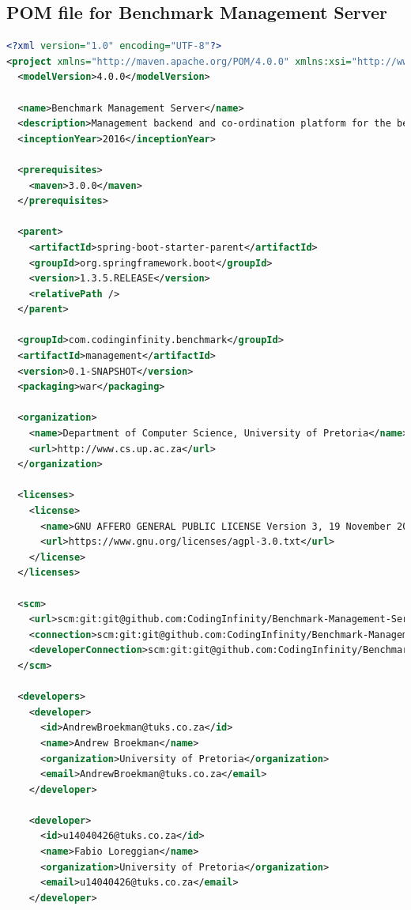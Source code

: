 \documentclass[11pt,a4paper]{article}
\begin{document}
\subsection{POM file for Benchmark Management Server}
\begin{lstlisting}[language=xml]
<?xml version="1.0" encoding="UTF-8"?>
<project xmlns="http://maven.apache.org/POM/4.0.0" xmlns:xsi="http://www.w3.org/2001/XMLSchema-instance" xsi:schemaLocation="http://maven.apache.org/POM/4.0.0 http://maven.apache.org/maven-v4_0_0.xsd">
  <modelVersion>4.0.0</modelVersion>

  <name>Benchmark Management Server</name>
  <description>Management backend and co-ordination platform for the benchmark service platform</description>
  <inceptionYear>2016</inceptionYear>

  <prerequisites>
    <maven>3.0.0</maven>
  </prerequisites>

  <parent>
    <artifactId>spring-boot-starter-parent</artifactId>
    <groupId>org.springframework.boot</groupId>
    <version>1.3.5.RELEASE</version>
    <relativePath />
  </parent>

  <groupId>com.codinginfinity.benchmark</groupId>
  <artifactId>management</artifactId>
  <version>0.1-SNAPSHOT</version>
  <packaging>war</packaging>

  <organization>
    <name>Department of Computer Science, University of Pretoria</name>
    <url>http://www.cs.up.ac.za</url>
  </organization>

  <licenses>
    <license>
      <name>GNU AFFERO GENERAL PUBLIC LICENSE Version 3, 19 November 2007</name>
      <url>https://www.gnu.org/licenses/agpl-3.0.txt</url>
    </license>
  </licenses>

  <scm>
    <url>scm:git:git@github.com:CodingInfinity/Benchmark-Management-Server.git</url>
    <connection>scm:git:git@github.com:CodingInfinity/Benchmark-Management-Server.git</connection>
    <developerConnection>scm:git:git@github.com:CodingInfinity/Benchmark-Management-Server.git</developerConnection>
  </scm>

  <developers>
    <developer>
      <id>AndrewBroekman@tuks.co.za</id>
      <name>Andrew Broekman</name>
      <organization>University of Pretoria</organization>
      <email>AndrewBroekman@tuks.co.za</email>
    </developer>

    <developer>
      <id>u14040426@tuks.co.za</id>
      <name>Fabio Loreggian</name>
      <organization>University of Pretoria</organization>
      <email>u14040426@tuks.co.za</email>
    </developer>


\end{lstlisting}
\end{document}
